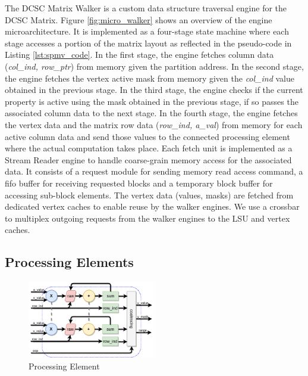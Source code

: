 The DCSC Matrix Walker is a custom data structure traversal engine for the DCSC Matrix. Figure \ref{fig:micro_walker} shows an overview of the engine microarchitecture. It is implemented as a four-stage state machine where each stage accesses a portion of the matrix layout as reflected in the pseudo-code in Listing \ref{lst:spmv_code}. In the first stage, the engine fetches column data (\textit{col\_ind, row\_ptr}) from memory given the partition address. In the second stage, the engine fetches the vertex active mask from memory given the \textit{col\_ind} value obtained in the previous stage. In the third stage, the engine checks if the current property is active using the mask obtained in the previous stage, if so passes the associated column data to the next stage. In the fourth stage, the engine fetches the vertex data and the matrix row data (\textit{row\_ind, a\_val}) from memory for each active column data and send those values to the connected processing element where the actual computation takes place. Each fetch unit is implemented as a Stream Reader engine to handle coarse-grain memory access for the associated data. It consists of a request module for sending memory read access command, a fifo buffer for receiving requested blocks and a temporary block buffer for accessing sub-block elements. The vertex data (values, masks) are fetched from dedicated vertex caches to enable reuse by the walker engines. We use a crossbar to multiplex outgoing requests from the walker engines to the LSU and vertex caches.

\subsection{Processing Elements}

\begin{figure}[htbp]
\centering
\includegraphics[width=0.5\textwidth]{figures/micro_pe}
\caption{Processing Element}
\label{fig:micro_pe}
\end{figure}

